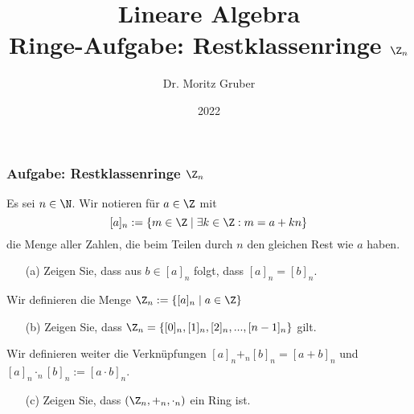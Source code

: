

\title{Lineare Algebra\\[3mm] 
	\large Ringe-Aufgabe: Restklassenringe $\Z_n$
}
\author{Dr. Moritz Gruber} 
\date{2022}



%
\begin{frame}[plain] 
 \titlepage
\end{frame}
%
%
\begin{frame} \frametitle{Aufgabe: Restklassenringe $\Z_n$}

Es sei $n \in \N$. Wir notieren f\"ur $a \in \Z$ mit
$$
[a]_n:=\{m \in \Z \mid \exists k\in \Z: m=a+kn\}
$$
die Menge aller Zahlen, die beim Teilen durch $n$ den gleichen Rest wie $a$ haben.

\begin{itemize}
\item[(a)] Zeigen Sie, dass aus $b \in [a]_n$ folgt, dass $[a]_n=[b]_n$.
\end{itemize}
Wir definieren die Menge
$
\Z_n := \{[a]_n \mid a \in \Z\}
$
\begin{itemize}
\item[(b)] Zeigen Sie, dass $\Z_n=\{[0]_n,[1]_n,[2]_n,...,[n-1]_n\}$ gilt.
\end{itemize}
Wir definieren weiter die Verkn\"upfungen $[a]_n+_n[b]_n=[a+b]_n$ und $[a]_n\cdot_n [b]_n:=[a\cdot b]_n$.
\begin{itemize}
\item[(c)] Zeigen Sie, dass $(\Z_n,+_n,\cdot_n)$ ein Ring ist.
\end{itemize}
\end{frame}
%

